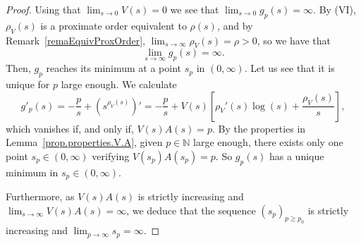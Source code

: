 \documentclass[11pt,a4paper]{article}
\theoremstyle{definition}
\def\oo{\infty}
\def\ri{\rightarrow}
\def\ro{\rho}
\def\N{\mathbb{N}}
\begin{document}
 \begin{proof}
 Using that $\lim_{s\ri0} V(s)=0$ we see that $\lim_{s\ri 0} g_{p}(s)=\oo$.
By (VI), $\ro_V(s)$ is a proximate order equivalent to $\ro(s)$, and by Remark~\ref{remaEquivProxOrder}, $\lim_{s\ri\oo} \ro_V(s)=\ro>0$, so we have that
 $$\lim_ {s\ri\oo} g_{p}(s) =\oo.$$
 Then, $g_{p}$ reaches its minimum at a point $s_p$ in $(0,\oo)$. Let us see that it is unique for $p$ large enough. We calculate
 $$g'_{p}(s)=-\frac{p}{s}+(s^{\ro_V(s)})'= -\frac{p}{s}+ V(s) [\ro_V'(s)\log(s)+\frac{\ro_V(s)}{s} ],$$
which vanishes if, and only if, $ V(s) A(s)=p$.
By the properties in Lemma~\ref{prop.properties.V.A},
given $p\in\N$ large enough, there exists only one point $s_p\in(0,\oo)$ verifying $V(s_p)A(s_p)=p$. So $g_{p}(s)$
has a unique minimum in $s_p\in (0,\oo)$.

Furthermore, as $V(s)A(s)$ is strictly increasing and $\lim_{s\ri\oo} V(s)A(s)=\oo$, we deduce that the sequence $(s_p)_{p\geq p_0}$
is strictly increasing and $\lim_{p\ri\oo} s_p=\oo$.
 \end{proof}
\end{document}
